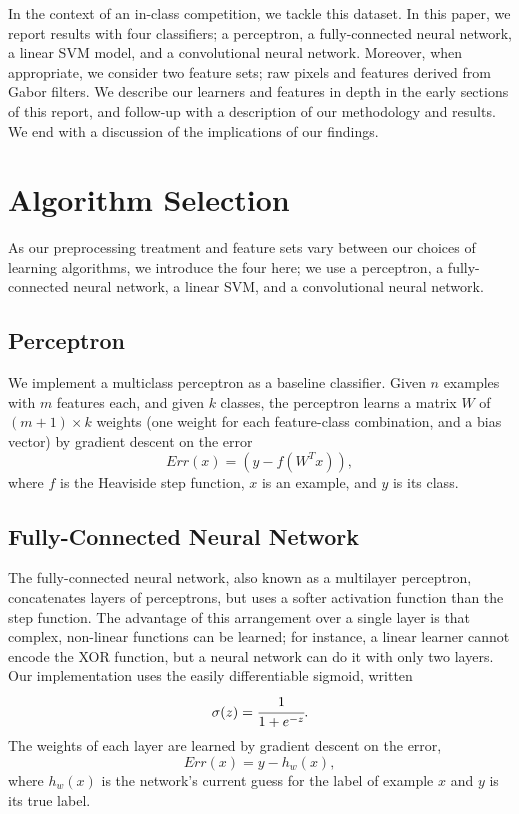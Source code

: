 \documentclass{acm_proc_article-sp}
\begin{document}
In the context of an in-class competition, we tackle this dataset. In this paper, we report results with four classifiers; a perceptron, a fully-connected neural network, a linear SVM model, and a convolutional neural network. Moreover, when appropriate, we consider two feature sets; raw pixels and features derived from Gabor filters. We describe our learners and features in depth in the early sections of this report, and follow-up with a description of our methodology and results. We end with a discussion of the implications of our findings.


\section{Algorithm Selection}%
As our preprocessing treatment and feature sets vary between our choices of learning algorithms, we introduce the four here; we use a perceptron, a fully-connected neural network, a linear SVM, and a convolutional neural network.

\subsection{Perceptron}
We implement a multiclass perceptron as a baseline classifier. Given $n$ examples with $m$ features each, and given $k$ classes, the perceptron learns a matrix $W$ of $(m+1) \times k$ weights (one weight for each feature-class combination, and a bias vector) by gradient descent on the error $$Err(x) = (y - f(W^Tx)),$$
where $f$ is the Heaviside step function, $x$ is an example, and $y$ is its class.

\subsection{Fully-Connected Neural Network}
The fully-connected neural network, also known as a multilayer perceptron, concatenates layers of perceptrons, but uses a softer activation function than the step function. The advantage of this arrangement over a single layer is that complex, non-linear functions can be learned; for instance, a linear learner cannot encode the XOR function, but a neural network can do it with only two layers. Our implementation uses the easily differentiable sigmoid, written $$\sigma(z) = \cfrac{1}{1 + e^{-z}}.$$ The weights of each layer are learned by gradient descent on the error, $$Err(x) = y - h_w(x),$$ where $h_w(x)$ is the network's current guess for the label of example $x$ and $y$ is its true label.
\end{document}
